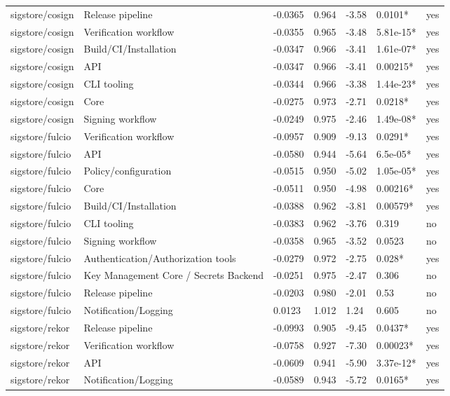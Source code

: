 \begin{table}[t]
\begin{tabular}{lllllll}
sigstore/cosign & Release pipeline & -0.0365 & 0.964 & -3.58 & 0.0101* & yes \\
sigstore/cosign & Verification workflow & -0.0355 & 0.965 & -3.48 & 5.81e-15* & yes \\
sigstore/cosign & Build/CI/Installation & -0.0347 & 0.966 & -3.41 & 1.61e-07* & yes \\
sigstore/cosign & API & -0.0347 & 0.966 & -3.41 & 0.00215* & yes \\
sigstore/cosign & CLI tooling & -0.0344 & 0.966 & -3.38 & 1.44e-23* & yes \\
sigstore/cosign & Core & -0.0275 & 0.973 & -2.71 & 0.0218* & yes \\
sigstore/cosign & Signing workflow & -0.0249 & 0.975 & -2.46 & 1.49e-08* & yes \\
sigstore/fulcio & Verification workflow & -0.0957 & 0.909 & -9.13 & 0.0291* & yes \\
sigstore/fulcio & API & -0.0580 & 0.944 & -5.64 & 6.5e-05* & yes \\
sigstore/fulcio & Policy/configuration & -0.0515 & 0.950 & -5.02 & 1.05e-05* & yes \\
sigstore/fulcio & Core & -0.0511 & 0.950 & -4.98 & 0.00216* & yes \\
sigstore/fulcio & Build/CI/Installation & -0.0388 & 0.962 & -3.81 & 0.00579* & yes \\
sigstore/fulcio & CLI tooling & -0.0383 & 0.962 & -3.76 & 0.319 & no \\
sigstore/fulcio & Signing workflow & -0.0358 & 0.965 & -3.52 & 0.0523 & no \\
sigstore/fulcio & Authentication/Authorization tools & -0.0279 & 0.972 & -2.75 & 0.028* & yes \\
sigstore/fulcio & Key Management Core / Secrets Backend & -0.0251 & 0.975 & -2.47 & 0.306 & no \\
sigstore/fulcio & Release pipeline & -0.0203 & 0.980 & -2.01 & 0.53 & no \\
sigstore/fulcio & Notification/Logging & 0.0123 & 1.012 & 1.24 & 0.605 & no \\
sigstore/rekor & Release pipeline & -0.0993 & 0.905 & -9.45 & 0.0437* & yes \\
sigstore/rekor & Verification workflow & -0.0758 & 0.927 & -7.30 & 0.00023* & yes \\
sigstore/rekor & API & -0.0609 & 0.941 & -5.90 & 3.37e-12* & yes \\
sigstore/rekor & Notification/Logging & -0.0589 & 0.943 & -5.72 & 0.0165* & yes \\

\end{tabular}
\end{table}

